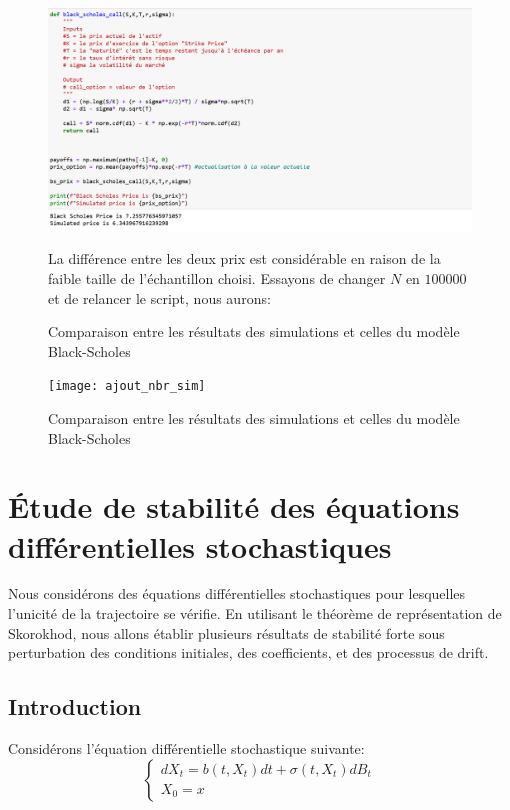 \documentclass[A4paper,12pt]{report}
\begin{document}
\begin{figure}[h]
  \centering
  \includegraphics[scale=0.7]{sim_vs_bs}
  \caption{Comparaison entre les résultats des simulations et celles du modèle Black-Scholes}
  \label{fig:mon_image}
  La différence entre les deux prix est considérable en raison de la faible taille de l'échantillon choisi. Essayons de changer $N$ en $100000$ et de relancer le script, nous aurons:
\end{figure}

\begin{figure}[h]
  \centering
  \texttt{[image: ajout\_nbr\_sim]}
  \caption{Comparaison entre les résultats des simulations et celles du modèle Black-Scholes}
  \label{fig:mon_image}
\end{figure}
\chapter{Étude de stabilité des équations différentielles stochastiques}
Nous considérons des équations différentielles stochastiques pour lesquelles l'unicité de la trajectoire se vérifie. En utilisant le théorème de représentation de Skorokhod, nous allons établir plusieurs résultats de stabilité forte sous perturbation des conditions initiales, des coefficients, et des processus de drift. 
\section{Introduction}
Considérons l'équation différentielle stochastique suivante:
\begin{equation}\label{E50}
\left\{\begin{array}{l}
d X_{t}= b\left(t, X_{t}\right) d t + \sigma\left(t, X_{t}\right) d B_{t} \\
X_{0}=x
\end{array}\right.
\end{equation}
\end{document}
